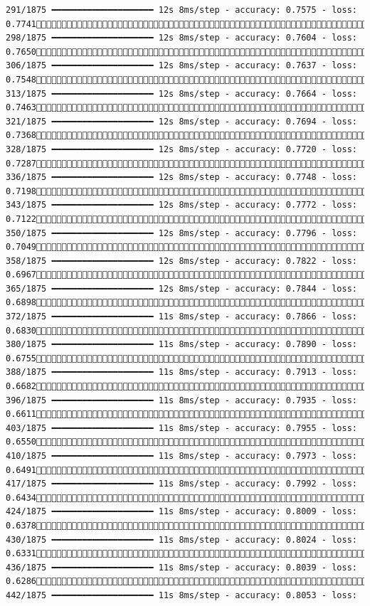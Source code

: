 \documentclass[
  letterpaper,
  DIV=11,
  numbers=noendperiod]{scrreprt}
\begin{document}
\begin{verbatim}
291/1875 ━━━━━━━━━━━━━━━━━━━━ 12s 8ms/step - accuracy: 0.7575 - loss: 0.7741 298/1875 ━━━━━━━━━━━━━━━━━━━━ 12s 8ms/step - accuracy: 0.7604 - loss: 0.7650 306/1875 ━━━━━━━━━━━━━━━━━━━━ 12s 8ms/step - accuracy: 0.7637 - loss: 0.7548 313/1875 ━━━━━━━━━━━━━━━━━━━━ 12s 8ms/step - accuracy: 0.7664 - loss: 0.7463 321/1875 ━━━━━━━━━━━━━━━━━━━━ 12s 8ms/step - accuracy: 0.7694 - loss: 0.7368 328/1875 ━━━━━━━━━━━━━━━━━━━━ 12s 8ms/step - accuracy: 0.7720 - loss: 0.7287 336/1875 ━━━━━━━━━━━━━━━━━━━━ 12s 8ms/step - accuracy: 0.7748 - loss: 0.7198 343/1875 ━━━━━━━━━━━━━━━━━━━━ 12s 8ms/step - accuracy: 0.7772 - loss: 0.7122 350/1875 ━━━━━━━━━━━━━━━━━━━━ 12s 8ms/step - accuracy: 0.7796 - loss: 0.7049 358/1875 ━━━━━━━━━━━━━━━━━━━━ 12s 8ms/step - accuracy: 0.7822 - loss: 0.6967 365/1875 ━━━━━━━━━━━━━━━━━━━━ 12s 8ms/step - accuracy: 0.7844 - loss: 0.6898 372/1875 ━━━━━━━━━━━━━━━━━━━━ 11s 8ms/step - accuracy: 0.7866 - loss: 0.6830 380/1875 ━━━━━━━━━━━━━━━━━━━━ 11s 8ms/step - accuracy: 0.7890 - loss: 0.6755 388/1875 ━━━━━━━━━━━━━━━━━━━━ 11s 8ms/step - accuracy: 0.7913 - loss: 0.6682 396/1875 ━━━━━━━━━━━━━━━━━━━━ 11s 8ms/step - accuracy: 0.7935 - loss: 0.6611 403/1875 ━━━━━━━━━━━━━━━━━━━━ 11s 8ms/step - accuracy: 0.7955 - loss: 0.6550 410/1875 ━━━━━━━━━━━━━━━━━━━━ 11s 8ms/step - accuracy: 0.7973 - loss: 0.6491 417/1875 ━━━━━━━━━━━━━━━━━━━━ 11s 8ms/step - accuracy: 0.7992 - loss: 0.6434 424/1875 ━━━━━━━━━━━━━━━━━━━━ 11s 8ms/step - accuracy: 0.8009 - loss: 0.6378 430/1875 ━━━━━━━━━━━━━━━━━━━━ 11s 8ms/step - accuracy: 0.8024 - loss: 0.6331 436/1875 ━━━━━━━━━━━━━━━━━━━━ 11s 8ms/step - accuracy: 0.8039 - loss: 0.6286 442/1875 ━━━━━━━━━━━━━━━━━━━━ 11s 8ms/step - accuracy: 0.8053 - loss: 
\end{verbatim}
\end{document}
